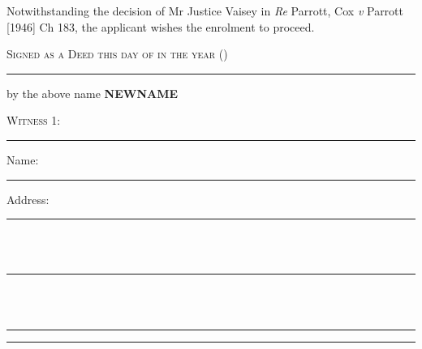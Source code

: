 \documentclass[10pt, twoside, a4paper]{article}
\renewcommand{\newname}{\textbf{NEWNAME}}
\begin{document}
\vspace{12pt}

Notwithstanding the decision of Mr Justice Vaisey in \textit{Re} Parrott, Cox
\textit{v} Parrott [1946] Ch 183, the applicant wishes the enrolment to
proceed.

\vspace{24pt}

{
	\scshape
	Signed as a Deed this \nth{\the\day} day of \monthname{} in the year
	{\the\year} (\isodate{\today})
}

\vspace{48pt}



\begin{multicols}{2}

	\par\noindent\hrule
	\vspace{14pt}

	{
		\centering
		\noindent
		by the above name \newname{}
		\par
	}

	\vspace{60pt}

	{\scshape \noindent Witness 1:}

	\vspace{48pt}
	\par\noindent\hrule
	\vspace{14pt}

	{
		\scshape

		\noindent Name: \\
		\noindent\hspace*{4em}\rule{0.35\textwidth}{0.5pt}

		\vspace{12pt}

		\noindent Address:

		\noindent\hspace*{4em}\rule{0.35\textwidth}{0.5pt} \\ \\
		\noindent\hspace*{4em}\rule{0.35\textwidth}{0.5pt} \\ \\
		\noindent\hspace*{4em}\rule{0.35\textwidth}{0.5pt}
	}

	\columnbreak

	\par\noindent\hrule
	\vspace{14pt}


\end{multicols}
\end{document}
